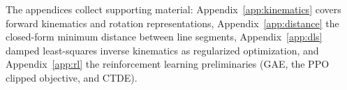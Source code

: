 The appendices collect supporting material: Appendix~\ref{app:kinematics} covers forward
kinematics and rotation representations, Appendix~\ref{app:distance} the closed-form minimum
distance between line segments, Appendix~\ref{app:dls} damped least-squares inverse kinematics as
regularized optimization, and Appendix~\ref{app:rl} the reinforcement learning preliminaries
(GAE, the PPO clipped objective, and CTDE).
